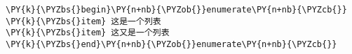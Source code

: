 \begin{Verbatim}[commandchars=\\\{\}]
\PY{k}{\PYZbs{}begin}\PY{n+nb}{\PYZob{}}enumerate\PY{n+nb}{\PYZcb{}}
\PY{k}{\PYZbs{}item} 这是一个列表
\PY{k}{\PYZbs{}item} 这又是一个列表
\PY{k}{\PYZbs{}end}\PY{n+nb}{\PYZob{}}enumerate\PY{n+nb}{\PYZcb{}}
\end{Verbatim}
